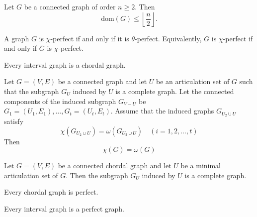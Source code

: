 \begin{theorem}
  \label{thm:12.4.1}
  Let $G$ be a connected graph of order $n \geq 2$. Then
  $$\text{dom}(G) \leq \left\lfloor \frac{n}{2} \right\rfloor.$$
\end{theorem}

\begin{theorem}
  \label{thm:12.4.2}
  A graph $G$ is $\chi$-perfect if and only if it is $\theta$-perfect. Equivalently, $G$ is $\chi$-perfect if and only if $\bar{G}$ is $\chi$-perfect.
\end{theorem}

\begin{theorem}
  \label{thm:12.4.3}
  Every interval graph is a chordal graph.
\end{theorem}

\begin{theorem}
  \label{thm:12.4.4}
  Let $G=(V, E)$ be a connected graph and let $U$ be an articulation set of $G$ such that the subgraph $G_U$ induced by $U$ is a complete graph. Let the connected components of the induced subgraph $G_{V-U}$ be $G_1=\left(U_1, E_1\right), \ldots, G_t=\left(U_t, E_t\right)$. Assume that the induced graphs $G_{U_2 \cup U}$ satisfy
  $$
  \chi\left(G_{U_2 \cup U}\right)=\omega\left(G_{U_2 \cup U}\right) \quad(i=1,2, \ldots, t)
  $$
  Then
  $$
  \chi(G)=\omega(G)
  $$
\end{theorem}

\begin{theorem}
  \label{thm:12.4.5}
  Let $G = (V, E)$ be a connected chordal graph and let $U$ be a minimal articulation set of $G$. Then the subgraph $G_U$ induced by $U$ is a complete graph.
\end{theorem}

\begin{theorem}
  \label{thm:12.4.6}
  Every chordal graph is perfect.
\end{theorem}

\begin{corollary}
  \label{cor:12.4.7}
  Every interval graph is a perfect graph.
\end{corollary}

